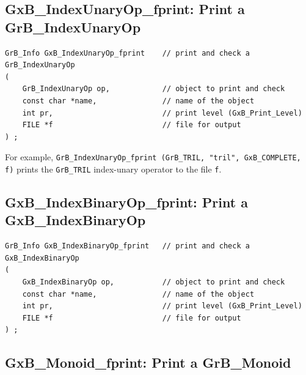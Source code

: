 \subsection{{\sf GxB\_IndexUnaryOp\_fprint:} Print a {\sf GrB\_IndexUnaryOp}}

\begin{mdframed}[userdefinedwidth=6in]
{\footnotesize
\begin{verbatim}
GrB_Info GxB_IndexUnaryOp_fprint    // print and check a GrB_IndexUnaryOp
(
    GrB_IndexUnaryOp op,            // object to print and check
    const char *name,               // name of the object
    int pr,                         // print level (GxB_Print_Level)
    FILE *f                         // file for output
) ;
\end{verbatim} } \end{mdframed}

For example,
\verb'GrB_IndexUnaryOp_fprint (GrB_TRIL, "tril", GxB_COMPLETE, f)' prints
the \verb'GrB_TRIL' index-unary operator to the file \verb'f'.

\newpage
\subsection{{\sf GxB\_IndexBinaryOp\_fprint:} Print a {\sf GxB\_IndexBinaryOp}}

\begin{mdframed}[userdefinedwidth=6in]
{\footnotesize
\begin{verbatim}
GrB_Info GxB_IndexBinaryOp_fprint   // print and check a GxB_IndexBinaryOp
(
    GxB_IndexBinaryOp op,           // object to print and check
    const char *name,               // name of the object
    int pr,                         // print level (GxB_Print_Level)
    FILE *f                         // file for output
) ;
\end{verbatim} } \end{mdframed}

\subsection{{\sf GxB\_Monoid\_fprint:} Print a {\sf GrB\_Monoid}}

